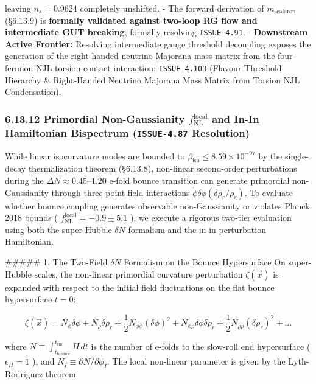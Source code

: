 \documentclass[11pt,a4paper]{article}
\theoremstyle{definition}
\theoremstyle{remark}
\begin{document}
leaving $n_s = 0.9624$ completely unshifted.
- The forward derivation of $m_{\text{scalaron}}$ (\S 6.13.9) is \textbf{formally validated against two-loop RG flow and intermediate GUT breaking}, formally resolving \texttt{ISSUE-4.91}.
- \textbf{Downstream Active Frontier:} Resolving intermediate gauge threshold decoupling exposes the generation of the right-handed neutrino Majorana mass matrix from the four-fermion NJL torsion contact interaction: \texttt{ISSUE-4.103} (Flavour Threshold Hierarchy \& Right-Handed Neutrino Majorana Mass Matrix from Torsion NJL Condensation).

\subsubsection{6.13.12 Primordial Non-Gaussianity $f_{\text{NL}}^{\text{local}}$ and In-In Hamiltonian Bispectrum (\texttt{ISSUE-4.87} Resolution)}

While linear isocurvature modes are bounded to $\beta_{\text{iso}} \le 8.59 \times 10^{-97}$ by the single-decay thermalization theorem (\S 6.13.8), non-linear second-order perturbations during the $\Delta N \approx 0.45\text{--}1.20$ e-fold bounce transition can generate primordial non-Gaussianity through three-point field interactions $\dot{\phi} \delta\phi (\delta\rho_r / \rho_r)$. To evaluate whether bounce coupling generates observable non-Gaussianity or violates Planck 2018 bounds ( $f_{\text{NL}}^{\text{local}} = -0.9 \pm 5.1$ ), we execute a rigorous two-tier evaluation using both the super-Hubble $\delta N$ formalism and the in-in perturbation Hamiltonian.

\#\#\#\#\# 1. The Two-Field $\delta N$ Formalism on the Bounce Hypersurface
On super-Hubble scales, the non-linear primordial curvature perturbation $\zeta(\vec{x})$ is expanded with respect to the initial field fluctuations on the flat bounce hypersurface $t = 0$:


\begin{equation}
\zeta(\vec{x}) = N_\phi \delta\phi + N_\rho \delta\rho_r + \frac{1}{2} N_{\phi\phi} (\delta\phi)^2 + N_{\phi\rho} \delta\phi \delta\rho_r + \frac{1}{2} N_{\rho\rho} (\delta\rho_r)^2 + \dots
\end{equation}


where $N \equiv \int_{t_{\text{bounce}}}^{t_{\text{end}}} H \, dt$ is the number of e-folds to the slow-roll end hypersurface ( $\epsilon_H = 1$ ), and $N_I \equiv \partial N / \partial \phi_I$. The local non-linear parameter is given by the Lyth-Rodriguez theorem:
\end{document}

